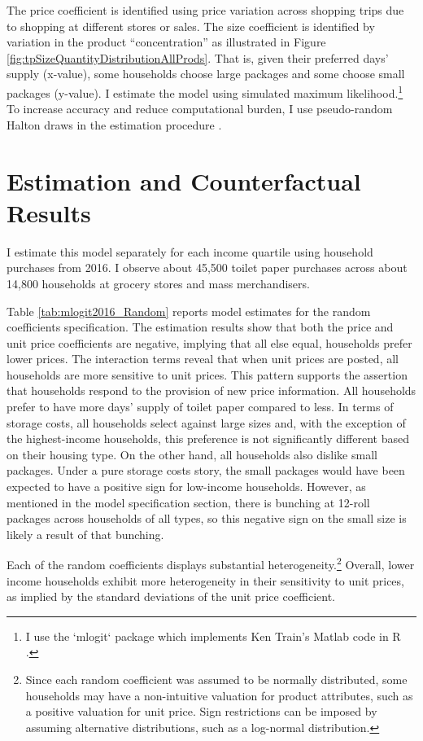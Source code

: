 \documentclass[AER]{AEA_mal}
\begin{document}
The price coefficient is identified using price variation across shopping trips due to shopping at different stores or sales. The size coefficient is identified by variation in the product ``concentration'' as illustrated in Figure \ref{fig:tpSizeQuantityDistributionAllProds}. That is, given their preferred days' supply (x-value), some households choose large packages and some choose small packages (y-value). I estimate the model using simulated maximum likelihood.\footnote{I use the `mlogit` package which implements Ken Train's Matlab code in R \citep{revelt1998,mlogit}.} To increase accuracy and reduce computational burden, I use pseudo-random Halton draws in the estimation procedure \citep{hensher2003}.

\section{Estimation and Counterfactual Results}
\label{estimation}

I estimate this model separately for each income quartile using household purchases from 2016. I observe about 45,500 toilet paper purchases across about 14,800 households at grocery stores and mass merchandisers.

Table \ref{tab:mlogit2016_Random} reports model estimates for the random coefficients specification. The estimation results show that both the price and unit price coefficients are negative, implying that all else equal, households prefer lower prices. The interaction terms reveal that when unit prices are posted, all households are more sensitive to unit prices. This pattern supports the assertion that households respond to the provision of new price information. All households prefer to have more days' supply of toilet paper compared to less. In terms of storage costs, all households select against large sizes and, with the exception of the highest-income households, this preference is not significantly different based on their housing type. On the other hand, all households also dislike small packages. Under a pure storage costs story, the small packages would have been expected to have a positive sign for low-income households. However, as mentioned in the model specification section, there is bunching at 12-roll packages across households of all types, so this negative sign on the small size is likely a result of that bunching.



Each of the random coefficients displays substantial heterogeneity.\footnote{Since each random coefficient was assumed to be normally distributed, some households may have a non-intuitive valuation for product attributes, such as a positive valuation for unit price. Sign restrictions can be imposed by assuming alternative distributions, such as a log-normal distribution.} Overall, lower income households exhibit more heterogeneity in their sensitivity to unit prices, as implied by the standard deviations of the unit price coefficient.
\end{document}
